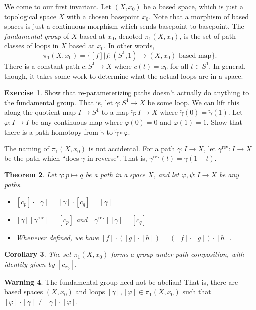 \documentclass[10pt]{amsart}
\newtheorem{thm}{Theorem}[section]
\newtheorem{corollary}[thm]{Corollary}
\theoremstyle{definition}
\newtheorem{watchout}[thm]{\warning \textbf{Warning} \warning}
\newtheorem{exercise}[thm]{Exercise}
\newcommand{\cdef}[1]{\textcolor{Bittersweet}{#1}}
\begin{document}
We come to our first invariant. Let $(X, x_0)$ be a based space, which is just a topological space $X$ with a chosen basepoint $x_0$. Note that a morphism of based spaces is just a continuous morphism which sends basepoint to basepoint. The \cdef{\emph{fundamental group}} of $X$ based at $x_0$, denoted $\pi_1(X, x_0)$, is the set of path classes of loops in $X$ based at $x_0$. In other words,
\[
\pi_1(X, x_0) = \{[f]|f:(S^1, 1) \to (X, x_0)\text{ based map}\}.
\]
There is a constant path $c:S^1 \to X$ where $c(t) = x_0$ for all $t \in S^1$. In general, though, it takes some work to determine what the actual loops are in a space.
\begin{exercise}
    Show that re-parameterizing paths doesn't actually do anything to the fundamental group. That is, let $\gamma:S^1 \to X$ be some loop. We can lift this along the quotient map $I \to S^1$ to a map $\tilde{\gamma}:I \to X$ where $\tilde{\gamma}(0) = \tilde{\gamma}(1)$. Let $\varphi:I \to I$ be any continuous map where $\varphi(0)=0$ and $\varphi(1) = 1$. Show that there is a path homotopy from $\tilde{\gamma}$ to $\tilde{\gamma} \circ \varphi$.
\end{exercise}
The naming of $\pi_1(X, x_0)$ is not accidental. For a path $\gamma:I \to X$, let $\gamma^{\text{rev}}:I \to X$ be the path which ``does $\gamma$ in reverse". That is, $\gamma^{\text{rev}}(t) = \gamma(1-t)$.
\begin{thm}
    Let $\gamma:p \mapsto q$ be a path in a space $X$, and let $\varphi, \psi:I \to X$ be any paths.
    \begin{itemize}
        \item $[c_p] \cdot [\gamma] = [\gamma] \cdot [c_q] = [\gamma]$
        \item $[\gamma][\gamma^\text{rev}] = [c_p]$ and $[\gamma^\text{rev}][\gamma] = [c_q]$
        \item Whenever defined, we have $[f] \cdot ([g]\cdot[h]) = ([f] \cdot [g]) \cdot [h]$.
    \end{itemize}
\end{thm}

\begin{corollary}
    The set $\pi_1(X, x_0)$ forms a group under path composition, with identity given by $[c_{x_0}].$
\end{corollary}

\begin{watchout}
    The fundamental group need not be abelian! That is, there are based spaces $(X, x_0)$ and loops $[\gamma], [\varphi] \in \pi_1(X, x_0)$ such that $[\varphi] \cdot [\gamma] \neq [\gamma] \cdot [\varphi].$
\end{watchout}
\end{document}
